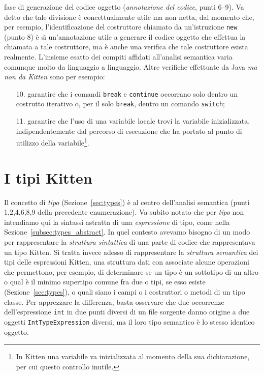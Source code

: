 fase di generazione del codice oggetto (\emph{annotazione del codice},
punti 6--9). Va detto che tale
divisione \`e concettualmente utile ma non netta, dal momento che, per
esempio, l'identificazione del costruttore chiamato da un'istruzione
\texttt{new} (punto 8) \`e s\`{\i} un'annotazione utile a
generare il codice oggetto
che effettua la chiamata a tale costruttore, ma \`e anche una verifica che
tale costruttore esista realmente. L'insieme esatto
dei compiti affidati all'analisi semantica varia comunque molto da
linguaggio a linguaggio.
Altre verifiche effettuate da Java \emph{ma non da Kitten} sono per esempio:
%
\begin{enumerate}
\item[10.] garantire che i comandi \texttt{break} e \texttt{continue}
           occorrano solo dentro un costrutto iterativo o, per il solo
           \texttt{break}, dentro un comando \texttt{switch};
\item[11.] garantire che l'uso di una variabile locale trovi la variabile
           inizializzata, indipendentemente dal percorso di esecuzione
           che ha portato al punto di utilizzo della variabile\footnote
           {In Kitten una variabile va inizializzata al momento
           della sua dichiarazione, per cui questo controllo \e inutile.}.
\end{enumerate}
%
\section{I tipi Kitten}\label{sec:semantical_types}
%
Il concetto di \emph{tipo} (Sezione~\ref{sec:types}) \`e al centro
dell'analisi semantica (punti 1,2,4,6,8,9 della precedente
enumerazione). Va subito notato che per \emph{tipo}
non intendiamo qui la sintassi
astratta di una \emph{espressione} di tipo, come nella
Sezione~\ref{subsec:types_abstract}. In quel contesto avevamo bisogno di
un modo per rappresentare la \emph{struttura sintattica} di una parte di codice
che rappresentava un tipo Kitten. Si tratta invece adesso di rappresentare
la \emph{struttura semantica} dei tipi delle espressioni Kitten,
\cioe una struttura dati con associate alcune operazioni
che permettono, per esempio, di determinare se un tipo \`e un sottotipo
di un altro o qual \`e il minimo supertipo
comune fra due o \piu tipi, se esso esiste (Sezione~\ref{sec:types}), o quali
siano i campi o i costruttori o metodi di un tipo classe.
Per apprezzare la differenza, basta osservare che
due occorrenze dell'espressione \texttt{int} in due punti diversi
di un file sorgente danno origine a due oggetti \texttt{IntTypeExpression}
diversi, ma il loro tipo semantico \`e lo stesso identico oggetto.

